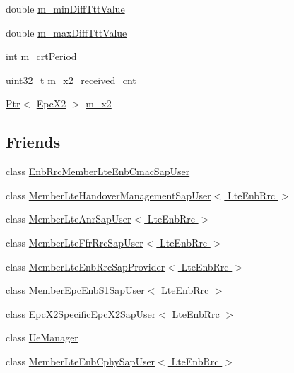 \begin{DoxyCompactItemize}
\item 
double \hyperlink{classns3_1_1LteEnbRrc_a8d4167d62f1ec725db35d049dd3610ba}{m\+\_\+min\+Diff\+Ttt\+Value}
\item 
double \hyperlink{classns3_1_1LteEnbRrc_a07ebdb9974f2aed7c20c089b6d612948}{m\+\_\+max\+Diff\+Ttt\+Value}
\item 
int \hyperlink{classns3_1_1LteEnbRrc_aace4582efc05d4990eaf4204aee468b7}{m\+\_\+crt\+Period}
\item 
uint32\+\_\+t \hyperlink{classns3_1_1LteEnbRrc_a19e06eed099d9628d94f6f8abd451fa7}{m\+\_\+x2\+\_\+received\+\_\+cnt}
\item 
\hyperlink{classns3_1_1Ptr}{Ptr}$<$ \hyperlink{classns3_1_1EpcX2}{Epc\+X2} $>$ \hyperlink{classns3_1_1LteEnbRrc_accb4d80adfcbca99bb6323dfd0bf16c0}{m\+\_\+x2}
\end{DoxyCompactItemize}
\subsection*{Friends}
\begin{DoxyCompactItemize}
\item 
class \hyperlink{classns3_1_1LteEnbRrc_ac0bf7155b0c200e61a35ba67db672437}{Enb\+Rrc\+Member\+Lte\+Enb\+Cmac\+Sap\+User}
\item 
class \hyperlink{classns3_1_1LteEnbRrc_ac3f732ab2e355690a2207ad7aaf1b70d}{Member\+Lte\+Handover\+Management\+Sap\+User$<$ Lte\+Enb\+Rrc $>$}
\item 
class \hyperlink{classns3_1_1LteEnbRrc_aa4633f94605355c16c9179a4fe00b5c8}{Member\+Lte\+Anr\+Sap\+User$<$ Lte\+Enb\+Rrc $>$}
\item 
class \hyperlink{classns3_1_1LteEnbRrc_abeceff6f007c0a4c34b234c13cf8ae86}{Member\+Lte\+Ffr\+Rrc\+Sap\+User$<$ Lte\+Enb\+Rrc $>$}
\item 
class \hyperlink{classns3_1_1LteEnbRrc_a9a20fa3e4d1499788bf43db9838cca09}{Member\+Lte\+Enb\+Rrc\+Sap\+Provider$<$ Lte\+Enb\+Rrc $>$}
\item 
class \hyperlink{classns3_1_1LteEnbRrc_a209c30e8ec094d8582484fc8401ccfe5}{Member\+Epc\+Enb\+S1\+Sap\+User$<$ Lte\+Enb\+Rrc $>$}
\item 
class \hyperlink{classns3_1_1LteEnbRrc_a76856e4bc6d5ab0b21f56beb6583f2ac}{Epc\+X2\+Specific\+Epc\+X2\+Sap\+User$<$ Lte\+Enb\+Rrc $>$}
\item 
class \hyperlink{classns3_1_1LteEnbRrc_a033aca790957c4d812831b4f1901de4b}{Ue\+Manager}
\item 
class \hyperlink{classns3_1_1LteEnbRrc_abc5fb56a156aaa75bbc307e590cedcc4}{Member\+Lte\+Enb\+Cphy\+Sap\+User$<$ Lte\+Enb\+Rrc $>$}
\end{DoxyCompactItemize}
